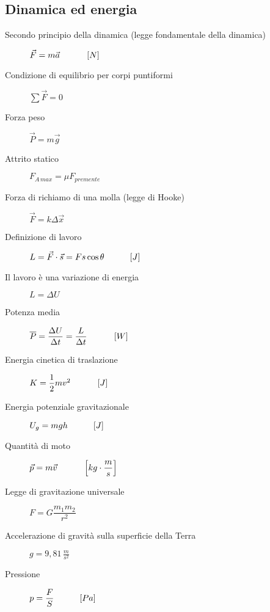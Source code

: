 \documentclass[a4paper,11pt,italian]{article}
\begin{document}
\subsection{Dinamica ed energia}
\begin{description}
  \item[Secondo principio della dinamica (legge fondamentale della dinamica)] 
  $ \vec{F} = m  \vec{a}   \hspace*{3em} \left[ N \right]  $
  
  
  \item[Condizione di equilibrio per corpi puntiformi]
  $ \sum\vec{F} = 0 $
  
  \item[Forza peso] 
  $ \vec{P} = m \vec{g} $
  
  \item[Attrito statico] 
  
  $ F_{A \, max} = \mu F_{premente} $
  
  \item[Forza di richiamo di una molla (legge di Hooke)]
  $ \vec{F} = k \Delta \vec{x} $
  
  \item[Definizione di lavoro] 
  $ L = \vec{F} \cdot \vec{s} = F s \cos\theta \hspace*{3em} [J]  $

  \item[Il lavoro è una variazione di energia] 
  $ L = \Delta U $
  
  \item[Potenza media] 
  $ \overline{P} = \dfrac{\Delta U}{\Delta t} = \dfrac{L}{\Delta t} \hspace*{3em} \left[ W \right] $
  
  
  \item[Energia cinetica di traslazione] 
  $ K = \dfrac{1}{2} mv^2 \hspace*{3em} \left[ J \right]$
  
  \item[Energia potenziale gravitazionale] 
  $ U_g = mgh \hspace*{3em} [J] $
  
  \item[Quantità di moto] 
  $ \vec{p} = m \vec{v} \hspace*{3em} \left[ kg \cdot \dfrac{m}{s} \right] $ 
  
  \item[Legge di gravitazione universale] 
  $ F = G \dfrac{m_1 m_2}{r^2} $
  
  \item[Accelerazione di gravità sulla superficie della Terra] 
$ g =  9, 81 \, \frac{m}{s^2} $

  \item[Pressione] 
$ p = \dfrac{F}{S} \hspace*{3em} [Pa]$
\end{description}
   
\end{document}
